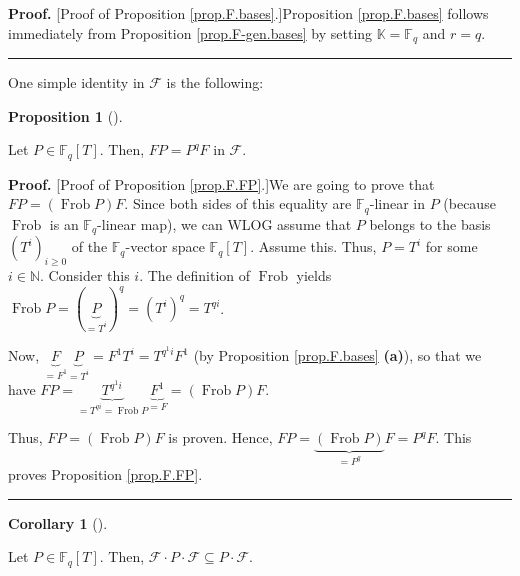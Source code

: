 \documentclass[numbers=enddot,12pt,final,onecolumn,notitlepage]{scrartcl}%
\theoremstyle{definition}
\newtheorem{prop}[theo]{Proposition}
\newenvironment{proposition}[1][]
{\begin{prop}[#1]\begin{leftbar}}
{\end{leftbar}\end{prop}}
\newtheorem{coro}[theo]{Corollary}
\newenvironment{corollary}[1][]
{\begin{coro}[#1]\begin{leftbar}}
{\end{leftbar}\end{coro}}
\newenvironment{proof}[1][Proof]{\noindent\textbf{#1.} }{\ \rule{0.5em}{0.5em}}
\begin{document}
\begin{proof}
[Proof of Proposition \ref{prop.F.bases}.]Proposition \ref{prop.F.bases}
follows immediately from Proposition \ref{prop.F-gen.bases} by setting
$\mathbb{K}=\mathbb{F}_{q}$ and $r=q$.
\end{proof}

One simple identity in $\mathcal{F}$ is the following:

\begin{proposition}
\label{prop.F.FP}Let $P\in\mathbb{F}_{q}\left[  T\right]  $. Then, $FP=P^{q}F$
in $\mathcal{F}$.
\end{proposition}

\begin{proof}
[Proof of Proposition \ref{prop.F.FP}.]We are going to prove that $FP=\left(
\operatorname*{Frob}P\right)  F$. Since both sides of this equality are
$\mathbb{F}_{q}$-linear in $P$ (because $\operatorname*{Frob}$ is an
$\mathbb{F}_{q}$-linear map), we can WLOG assume that $P$ belongs to the basis
$\left(  T^{i}\right)  _{i\geq0}$ of the $\mathbb{F}_{q}$-vector space
$\mathbb{F}_{q}\left[  T\right]  $. Assume this. Thus, $P=T^{i}$ for some
$i\in\mathbb{N}$. Consider this $i$. The definition of $\operatorname*{Frob}$
yields $\operatorname*{Frob}P=\left(  \underbrace{P}_{=T^{i}}\right)
^{q}=\left(  T^{i}\right)  ^{q}=T^{qi}$.

Now, $\underbrace{F}_{=F^{1}}\underbrace{P}_{=T^{i}}=F^{1}T^{i}=T^{q^{1}%
i}F^{1}$ (by Proposition \ref{prop.F.bases} \textbf{(a)}), so that we have
$FP=\underbrace{T^{q^{1}i}}_{=T^{qi}=\operatorname*{Frob}P}\underbrace{F^{1}%
}_{=F}=\left(  \operatorname*{Frob}P\right)  F$.

Thus, $FP=\left(  \operatorname*{Frob}P\right)  F$ is proven. Hence,
$FP=\underbrace{\left(  \operatorname*{Frob}P\right)  }_{=P^{q}}F=P^{q}F$.
This proves Proposition \ref{prop.F.FP}.
\end{proof}

\begin{corollary}
\label{cor.F.FPF}Let $P\in\mathbb{F}_{q}\left[  T\right]  $. Then,
$\mathcal{F}\cdot P\cdot\mathcal{F}\subseteq P\cdot\mathcal{F}$.
\end{corollary}
\end{document}
